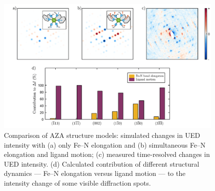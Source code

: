 \begin{figure}[ht!]
  \centering
  \includegraphics[width = \textwidth]{Figures/fig_AZA_models.pdf}
  \caption[Comparison of AZA structure models.]{
    Comparison of AZA structure models:
    simulated changes in UED intensity with (a) only Fe--N elongation
    and (b) simultaneous Fe--N elongation and ligand motion;
    (c) measured time-resolved changes in UED intensity.
    (d) Calculated contribution of different structural dynamics
    --- Fe--N elongation versus ligand motion ---
    to the intensity change of some visible diffraction spots.
  }
  \label{fig: AZA-models}
\end{figure}

